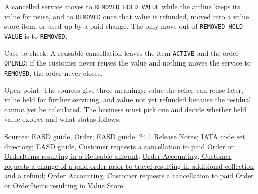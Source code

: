 \begin{definition}
  \label{def:delivery-removed-hold-value}
  A cancelled service moves to \texttt{REMOVED HOLD VALUE} while the airline
  keeps its value for reuse, and to \texttt{REMOVED} once that value is
  refunded, moved into a value store item, or used up by a paid change. The
  only move out of \texttt{REMOVED HOLD VALUE} is to \texttt{REMOVED}.

  Case to check: A reusable cancellation leaves the item \texttt{ACTIVE} and
  the order \texttt{OPENED}; if the customer never reuses the value and
  nothing moves the service to \texttt{REMOVED}, the order never closes.

  Open point: The sources give three meanings: value the seller can reuse
  later, value held for further servicing, and value not yet refunded
  because the residual cannot yet be calculated. The business must pick one
  and decide whether held value expires and what status follows.

  Sources: \href{https://standards.atlassian.net/wiki/spaces/EASD/pages/574849062/Order}{EASD guide, Order};
  \href{https://standards.atlassian.net/wiki/spaces/EASD/pages/1404665857}{EASD guide, 24.1 Release Notes};
  \href{https://standards.atlassian.net/wiki/spaces/AIDM/pages/607420437/View+IATA+Codeset+Directory}{IATA code set directory};
  \href{https://standards.atlassian.net/wiki/spaces/EASD/pages/817594921}{EASD guide, Customer requests a cancellation to paid Order or OrderItems resulting in a Reusable amount};
  \href{https://standards.atlassian.net/wiki/spaces/OA/pages/844202130}{Order Accounting, Customer requests a change of a paid order prior to travel resulting in additional collection and a refund};
  \href{https://standards.atlassian.net/wiki/spaces/OA/pages/844169268}{Order Accounting, Customer requests a cancellation to paid Order or OrderItems resulting in Value Store}.
\end{definition}

